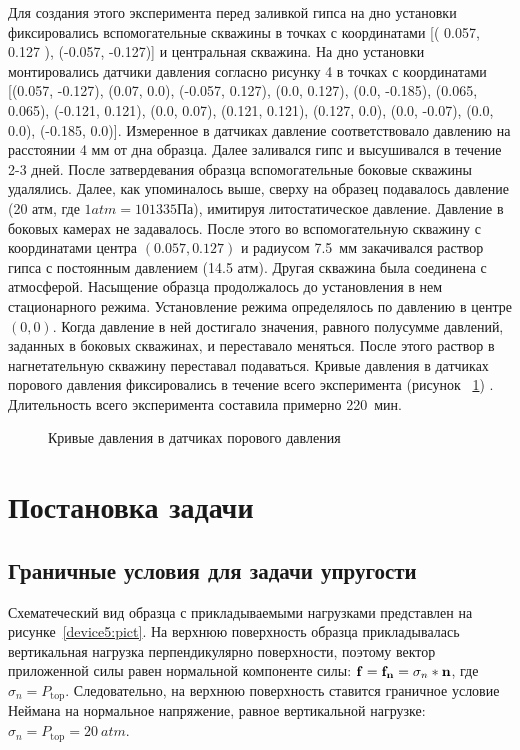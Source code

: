 Для создания этого эксперимента перед заливкой гипса на дно установки фиксировались вспомогательные скважины в точках с координатами [( 0.057, 0.127 ), (-0.057, -0.127)] и центральная скважина. На дно установки монтировались датчики давления согласно рисунку 4 в точках с координатами [(0.057, -0.127), (0.07, 0.0), (-0.057, 0.127), (0.0, 0.127), (0.0, -0.185), (0.065, 0.065), (-0.121, 0.121), (0.0, 0.07), (0.121, 0.121), (0.127, 0.0), (0.0, -0.07), (0.0, 0.0), (-0.185, 0.0)].  Измеренное в датчиках давление соответствовало давлению на расстоянии 4 мм от дна образца. Далее заливался гипс и высушивался в течение 2-3 дней. После затвердевания образца вспомогательные боковые скважины удалялись. Далее, как упоминалось выше, сверху на образец подавалось давление (20 атм, где $1 atm = 101335 Па$), имитируя литостатическое давление. Давление в боковых камерах не задавалось. После этого во вспомогательную скважину с координатами центра $(0.057, 0.127 )$ и радиусом 7.5~мм закачивался раствор гипса с постоянным давлением (14.5 атм). Другая скважина была соединена с атмосферой. Насыщение образца продолжалось до установления в нем стационарного режима. Установление режима определялось по давлению в  центре $(0, 0)$. Когда давление в ней достигало значения, равного полусумме давлений, заданных в боковых скважинах, и переставало меняться. После этого раствор в нагнетательную скважину переставал подаваться. Кривые давления в датчиках порового давления фиксировались в течение всего эксперимента (рисунок ~\ref{device4:pict}) . Длительность всего эксперимента составила примерно 220~мин. 

\begin{figure}[hb]
\begin{center}
\end{center}
\caption{Кривые давления в датчиках порового давления}\label{device4:pict}
\end{figure}

\section{Постановка задачи}
\subsection{Граничные условия для задачи упругости}

Схематеческий вид образца с прикладываемыми нагрузками представлен на рисунке~\ref{device5:pict}. На верхнюю поверхность образца прикладывалась вертикальная нагрузка перпендикулярно поверхности, поэтому вектор приложенной силы равен нормальной компоненте силы: $\mathbf{f}=\mathbf{f_n}=\sigma_n*\mathbf{n}$, где $\sigma_n=P_\text{top}$. Следовательно, на верхнюю поверхность ставится граничное условие Неймана на нормальное напряжение, равное вертикальной нагрузке: $\sigma_n = P_\text{top} = 20~atm$.

